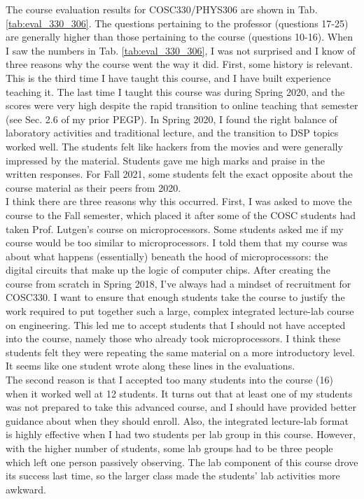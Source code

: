 \documentclass[../../main.tex]{subfiles}
\begin{document}
The course evaluation results for COSC330/PHYS306 are shown in Tab. \ref{tab:eval_330_306}.  The questions pertaining to the professor (questions 17-25) are generally higher than those pertaining to the course (questions 10-16).  When I saw the numbers in Tab. \ref{tab:eval_330_306}, I was not surprised and I know of three reasons why the course went the way it did.  First, some history is relevant.  This is the third time I have taught this course, and I have built experience teaching it.  The last time I taught this course was during Spring 2020, and the scores were very high despite the rapid transition to online teaching that semester (see Sec. 2.6 of my prior PEGP).  In Spring 2020, I found the right balance of laboratory activities and traditional lecture, and the transition to DSP topics worked well.  The students felt like hackers from the movies and were generally impressed by the material.  Students gave me high marks and praise in the written responses.  For Fall 2021, some students felt the exact opposite about the course material as their peers from 2020.
\\
\vspace{0.25cm}
I think there are three reasons why this occurred.  First, I was asked to move the course to the Fall semester, which placed it after some of the COSC students had taken Prof. Lutgen's course on microprocessors.  Some students asked me if my course would be too similar to microprocessors.  I told them that my course was about what happens (essentially) beneath the hood of microprocessors: the digital circuits that make up the logic of computer chips.  After creating the course from scratch in Spring 2018, I've always had a mindset of recruitment for COSC330.  I want to ensure that enough students take the course to justify the work required to put together such a large, complex integrated lecture-lab course on engineering.  This led me to accept students that I should not have accepted into the course, namely those who already took microprocessors.  I think these students felt they were repeating the same material on a more introductory level.  It seems like one student wrote along these lines in the evaluations.
\\
\vspace{0.25cm}
The second reason is that I accepted too many students into the course (16) when it worked well at 12 students.  It turns out that at least one of my students was not prepared to take this advanced course, and I should have provided better guidance about when they should enroll.  Also, the integrated lecture-lab format is highly effective when I had two students per lab group in this course.  However, with the higher number of students, some lab groups had to be three people which left one person passively observing.  The lab component of this course drove its success last time, so the larger class made the students' lab activities more awkward.
\end{document}
